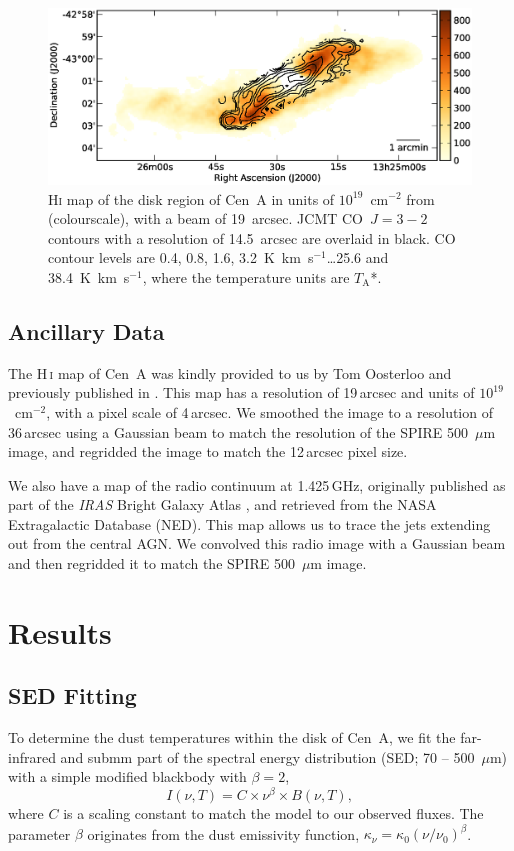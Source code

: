 \documentclass[useAMS,usenatbib,usegraphicx]{mn2e}
\begin{document}
\begin{figure}
\includegraphics[width=15cm]{Fig2_CenA_gas_obs}
\caption{H\textsc{i} map of the disk region of Cen~A in units of $10^{19}$~cm$^{-2}$ from \citet{2010A&A...515A..67S} (colourscale), with a beam of 19~arcsec.  JCMT CO~$J=3-2$ contours with a resolution of 14.5~arcsec are overlaid in black.  CO contour levels are 0.4, 0.8, 1.6, 3.2~K~km~s$^{-1}$\ldots25.6 and 38.4~K~km~s$^{-1}$, where the temperature units are $T_{\mathrm{A}}$*.}
\label{fig:co_map}
\end{figure}

\subsection{Ancillary Data}\label{subsec:Ancillary}
The H\,\textsc{i} map of Cen~A was kindly provided to us by Tom Oosterloo and previously published in \citet{2010A&A...515A..67S}.  This map has a resolution of 19\,arcsec and units of $10^{19}$~cm$^{-2}$, with a pixel scale of 4\,arcsec.  We smoothed the image to a resolution of 36\,arcsec using a Gaussian beam to match the resolution of the SPIRE 500~$\mu$m image, and regridded the image to match the 12\,arcsec pixel size.

We also have a map of the radio continuum at 1.425\,GHz, originally published as part of the \emph{IRAS} Bright Galaxy Atlas \citep{1996ApJS..103...81C}, and retrieved from the NASA Extragalactic Database (NED).  This map allows us to trace the jets extending out from the central AGN.  We convolved this radio image with a Gaussian beam and then regridded it to match the SPIRE 500~$\mu$m image.


\section{Results}\label{sec:results}
\subsection{SED Fitting}\label{subsec:sed}
To determine the dust temperatures within the disk of Cen~A, we fit the far-infrared and submm part of the spectral energy distribution (SED; 70 -- 500~$\mu$m) with a simple modified blackbody with $\beta = 2$,
\begin{equation}\label{eqn:blackbody}
 I(\nu,T) = C \times \nu^{\beta} \times B(\nu,T),
\end{equation}
where $C$ is a scaling constant to match the model to our observed fluxes.  The parameter $\beta$ originates from the dust emissivity function, $\kappa_{\nu} = \kappa_{0}(\nu/\nu_{0})^{\beta}$.
\end{document}
